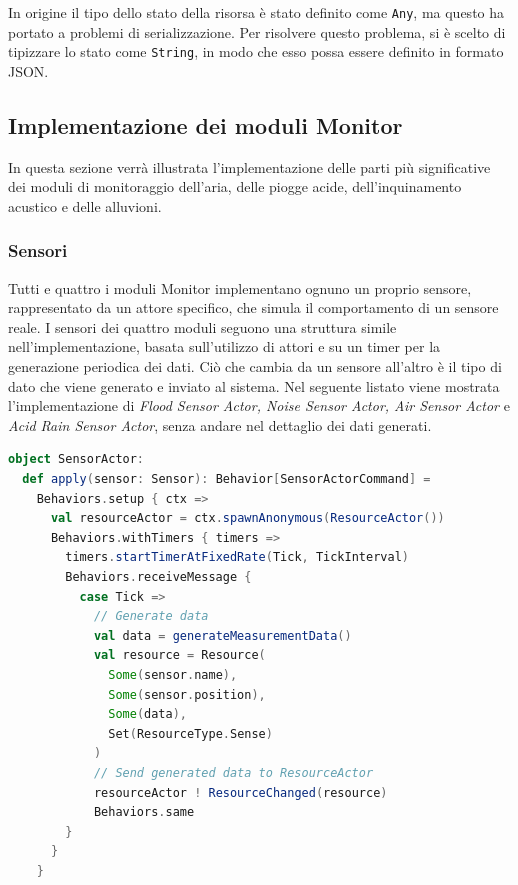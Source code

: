 \documentclass{scrartcl}
\begin{document}
In origine il tipo dello stato della risorsa è stato definito come \verb|Any|, ma questo ha portato a problemi di serializzazione. Per risolvere questo problema, si è scelto di tipizzare lo stato come \verb|String|, in modo che esso possa essere definito in formato JSON.

\subsection{Implementazione dei moduli Monitor}
In questa sezione verrà illustrata l'implementazione delle parti più significative dei moduli di monitoraggio dell'aria, delle piogge acide, dell'inquinamento acustico e delle alluvioni.

\subsubsection{Sensori}
Tutti e quattro i moduli Monitor implementano ognuno un proprio sensore, rappresentato da un attore specifico, che simula il comportamento di un sensore reale. I sensori dei quattro moduli seguono una struttura simile nell'implementazione, basata sull'utilizzo di attori e su un timer per la generazione periodica dei dati. Ciò che cambia da un sensore all'altro è il tipo di dato che viene generato e inviato al sistema.
Nel seguente listato viene mostrata l'implementazione di \textit{Flood Sensor Actor,
    Noise Sensor Actor, Air Sensor Actor} e \textit{Acid Rain Sensor Actor}, senza andare nel dettaglio dei dati generati.

\begin{lstlisting}[language=Scala]
object SensorActor:
  def apply(sensor: Sensor): Behavior[SensorActorCommand] =
    Behaviors.setup { ctx =>
      val resourceActor = ctx.spawnAnonymous(ResourceActor())
      Behaviors.withTimers { timers =>
        timers.startTimerAtFixedRate(Tick, TickInterval)
        Behaviors.receiveMessage {
          case Tick =>
            // Generate data
            val data = generateMeasurementData()
            val resource = Resource(
              Some(sensor.name),
              Some(sensor.position),
              Some(data),
              Set(ResourceType.Sense)
            )
            // Send generated data to ResourceActor
            resourceActor ! ResourceChanged(resource)
            Behaviors.same
        }
      }
    }
\end{lstlisting}
\end{document}
